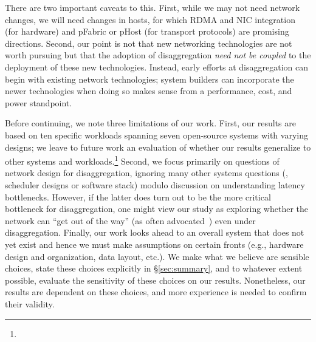 There are two important caveats to this.  First, while we may not need network changes, we will need changes in hosts, for which RDMA and NIC integration (for hardware) and pFabric or pHost (for transport protocols) are promising directions. Second, our point is not that new networking technologies are not worth pursuing but that the adoption of disaggregation \emph{need not be coupled} to the deployment of these new technologies. Instead, early efforts at disaggregation can begin with existing network technologies; system builders can incorporate the newer technologies when doing so makes sense from a performance, cost, and power standpoint.

Before continuing, we note three limitations of our work. First, our results are based on ten specific workloads spanning seven open-source systems with varying designs; we leave to future work an evaluation of whether our results generalize to other systems and workloads.\footnote{}
Second, we focus primarily on questions of network design for disaggregation, ignoring many other systems questions (\eg, scheduler designs or software stack) modulo discussion on understanding latency bottlenecks. However, if the latter does turn out to be the more critical bottleneck for disaggregation, one might view our study as exploring whether the network can ``get out of the way'' (as often advocated~\cite{greenberg-sigcomm15}) even under disaggregation. 
Finally, our work looks ahead to an overall system that does not yet exist and hence we must make assumptions on certain fronts (e.g., hardware design and organization, data layout, etc.). 
We make what we believe are sensible choices, state these choices explicitly in \S\ref{sec:summary}, and to whatever extent possible, evaluate the sensitivity of these choices on our results. 
Nonetheless, our results are dependent on these choices, and more experience is needed to confirm their validity.


